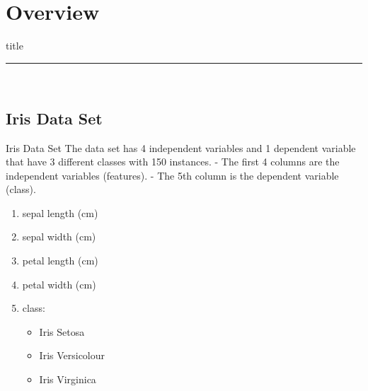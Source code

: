 \documentclass{beamer}
\begin{document}
\section{Overview}
    \begin{frame}[plain]
        \vfill
      \centering
      \begin{beamercolorbox}[sep=8pt,center,shadow=true,rounded=true]{title}
        \insertsectionhead\par%
        \color{oxfordblue}\noindent\rule{10cm}{1pt} \\
        \LARGE{\faFileTextO}
      \end{beamercolorbox}
      \vfill
  \end{frame}


\subsection{Iris Data Set}
    \begin{frame}{Iris Data Set}
        \hspace{0.5cm}The data set has 4 independent variables and 1 dependent variable that have 3 different classes with 150 instances. \break
         - The first 4 columns are the independent variables (features). \break
         - The 5th column is the dependent variable (class).
        \begin{enumerate}
            \item sepal length (cm)
            \item sepal width (cm)
            \item petal length (cm)
            \item petal width (cm)
            \item class:
            \begin{itemize}
                \item Iris Setosa
                \item Iris Versicolour
                \item Iris Virginica
            \end{itemize}
        \end{enumerate}
    \end{frame}
\end{document}
